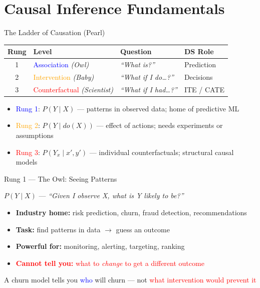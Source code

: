 \documentclass{beamer}
\newcommand{\blue}[1]{\textcolor{blue}{#1}}
\newcommand{\red}[1]{\textcolor{red}{#1}}
\newcommand{\orange}[1]{\textcolor{orange}{#1}}
\begin{document}
\section{Causal Inference Fundamentals}

\begin{frame}{The Ladder of Causation (Pearl) }

\renewcommand{\arraystretch}{1.35}
\begin{tabularx}{\textwidth}{clXl}
\toprule
\textbf{Rung} & \textbf{Level} & \textbf{Question} & \textbf{DS Role} \\
\midrule
1 & \blue{Association} \textit{(Owl)}         & \textit{``What is?''}             & Prediction       \\
2 & \orange{Intervention} \textit{(Baby)}     & \textit{``What if I do\ldots?''}  & Decisions        \\
3 & \red{Counterfactual} \textit{(Scientist)} & \textit{``What if I had\ldots?''} & ITE / CATE       \\
\bottomrule
\end{tabularx}

\vspace{0.1cm}
{\footnotesize
\begin{itemize}\setlength{\itemsep}{0.02cm}
    \item \blue{Rung 1}: $P(Y \mid X)$ --- patterns in observed data; home of predictive ML
    \item \orange{Rung 2}: $P(Y \mid do(X))$ --- effect of actions; needs experiments or assumptions
    \item \red{Rung 3}: $P(Y_x \mid x', y')$ --- individual counterfactuals; structural causal models
\end{itemize}
}

\end{frame}


\begin{frame}{Rung 1 --- The Owl: Seeing Patterns }

$P(Y \mid X)$ --- \textit{``Given I observe X, what is Y likely to be?''}

\vspace{0.2cm}
\begin{itemize}\setlength{\itemsep}{0.12cm}
    \item \textbf{Industry home:} risk prediction, churn, fraud detection, recommendations
    \item \textbf{Task:} find patterns in data $\rightarrow$ guess an outcome
    \item \textbf{Powerful for:} monitoring, alerting, targeting, ranking
    \item \red{\textbf{Cannot tell you:} what to \textit{change} to get a different outcome}
\end{itemize}

\vspace{0.2cm}
{\small A churn model tells you \blue{who} will churn --- not \red{what intervention would prevent it}}

\end{frame}
\end{document}
